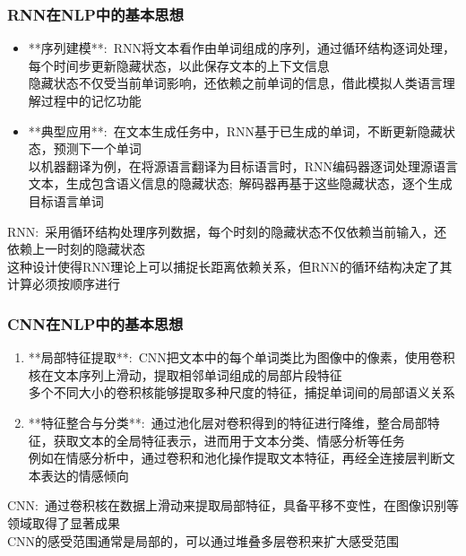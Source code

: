\small
\begin{frame}
	\frametitle{\textrm{RNN}在\textrm{NLP}中的基本思想}
    \begin{itemize}
    \item **序列建模**:~\textrm{RNN}将文本看作由单词组成的序列，通过循环结构逐词处理，每个时间步更新隐藏状态，以此保存文本的上下文信息\\
	    隐藏状态不仅受当前单词影响，还依赖之前单词的信息，借此模拟人类语言理解过程中的记忆功能
    \item **典型应用**:~在文本生成任务中，\textrm{RNN}基于已生成的单词，不断更新隐藏状态，预测下一个单词\\
	    以机器翻译为例，在将源语言翻译为目标语言时，\textrm{RNN}编码器逐词处理源语言文本，生成包含语义信息的隐藏状态;~解码器再基于这些隐藏状态，逐个生成目标语言单词
    \end{itemize}
	    \textrm{RNN}:~采用循环结构处理序列数据，每个时刻的隐藏状态不仅依赖当前输入，还依赖上一时刻的隐藏状态\\
		    这种设计使得\textrm{RNN}理论上可以捕捉长距离依赖关系，但\textrm{RNN}的循环结构决定了其计算必须按顺序进行
\end{frame}

\begin{frame}
	\frametitle{\textrm{CNN}在\textrm{NLP}中的基本思想}
    \begin{enumerate}
	    \item **局部特征提取**:~\textrm{CNN}把文本中的每个单词类比为图像中的像素，使用卷积核在文本序列上滑动，提取相邻单词组成的局部片段特征\\
		    多个不同大小的卷积核能够提取多种尺度的特征，捕捉单词间的局部语义关系
        \item **特征整合与分类**:~通过池化层对卷积得到的特征进行降维，整合局部特征，获取文本的全局特征表示，进而用于文本分类、情感分析等任务\\
		例如在情感分析中，通过卷积和池化操作提取文本特征，再经全连接层判断文本表达的情感倾向
    \end{enumerate}
	    \textrm{CNN}:~通过卷积核在数据上滑动来提取局部特征，具备平移不变性，在图像识别等领域取得了显著成果\\
		    \textrm{CNN}的感受范围通常是局部的，可以通过堆叠多层卷积来扩大感受范围
\end{frame}

